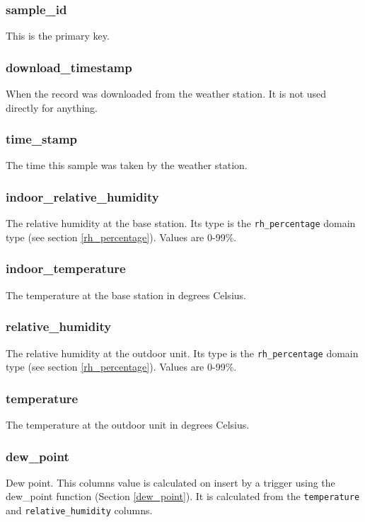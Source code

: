 \documentclass[a4paper,10pt]{book}
\begin{document}
\subsubsection{sample\_id}
This is the primary key.

\subsubsection{download\_timestamp}
When the record was downloaded from the weather station. It is not used directly for anything.

\subsubsection{time\_stamp}
The time this sample was taken by the weather station. 

\subsubsection{indoor\_relative\_humidity}
The relative humidity at the base station. Its type is the \verb|rh_percentage| domain type (see section \ref{rh_percentage}). Values are 0-99\%.

\subsubsection{indoor\_temperature}
The temperature at the base station in degrees Celsius. 

\subsubsection{relative\_humidity}
The relative humidity at the outdoor unit. Its type is the \verb|rh_percentage| domain type (see section \ref{rh_percentage}). Values are 0-99\%.

\subsubsection{temperature}
The temperature at the outdoor unit in degrees Celsius.

\subsubsection{dew\_point}
Dew point. This columns value is calculated on insert by a trigger using the dew\_point function (Section \ref{dew_point}). It is calculated from the \verb|temperature| and \verb|relative_humidity| columns.
\end{document}
